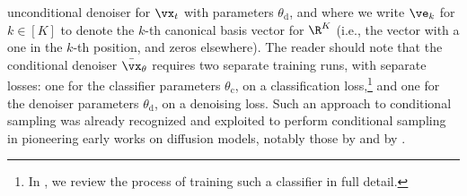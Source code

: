 \documentclass[../../book-main.tex]{subfiles}
\begin{document}
unconditional denoiser for $\vx_t$ with parameters $\theta_{\mathrm{d}}$, and
where we write $\ve_k$ for $k \in [K]$ to denote the $k$-th canonical basis
vector for $\R^K$ (i.e., the vector with
a one in the $k$-th position, and zeros elsewhere).
The reader should note that the conditional denoiser $\bar{\vx}_{\theta}$
requires two separate training runs, with separate losses: one for the
classifier parameters $\theta_{\mathrm{c}}$, on a classification
loss,\footnote{In , we review the process of training such
a classifier in full detail.} and one for the denoiser parameters
$\theta_{\mathrm{d}}$, on a denoising loss. Such an approach to conditional
sampling was already recognized and exploited to perform conditional sampling in
pioneering early works on diffusion models, notably those by
\citet{Sohl-Dickstein2015} and by \citet{song2020score}.
\end{document}
